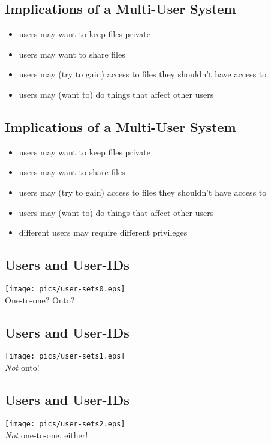 \documentclass[xga]{xdvislides}
\begin{document}
\subsection{Implications of a Multi-User System}
\begin{itemize}
	\item users may want to keep files private
	\item users may want to share files
	\item users may (try to gain) access to files they shouldn't have access to
	\item users may (want to) do things that affect other users
\end{itemize}

\subsection{Implications of a Multi-User System}
\begin{itemize}
	\item users may want to keep files private
	\item users may want to share files
	\item users may (try to gain) access to files they shouldn't have access to
	\item users may (want to) do things that affect other users
	\item different users may require different privileges
\end{itemize}

\subsection{Users and User-IDs}
\begin{center}
	\texttt{[image: pics/user-sets0.eps]} \\
	One-to-one?  Onto?
\end{center}

\subsection{Users and User-IDs}
\begin{center}
	\texttt{[image: pics/user-sets1.eps]} \\
	{\em Not} onto!
\end{center}

\subsection{Users and User-IDs}
\begin{center}
	\texttt{[image: pics/user-sets2.eps]} \\
	{\em Not} one-to-one, either!
\end{center}
\end{document}
